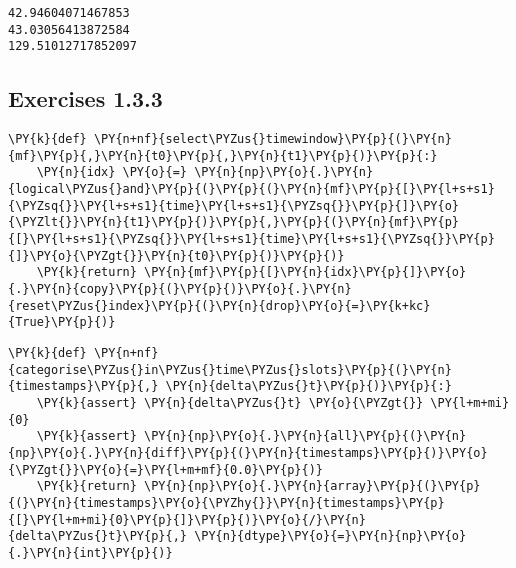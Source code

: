 \documentclass[11pt]{article}
\begin{document}
    \begin{Verbatim}[commandchars=\\\{\}]
42.94604071467853
43.03056413872584
129.51012717852097
    \end{Verbatim}

    \hypertarget{exercises-1.3.3}{%
\subsection*{Exercises 1.3.3}\label{exercises-1.3.3}}

    \begin{tcolorbox}[breakable, size=fbox, boxrule=1pt, pad at break*=1mm,colback=cellbackground, colframe=cellborder]
\begin{Verbatim}[commandchars=\\\{\}]
\PY{k}{def} \PY{n+nf}{select\PYZus{}timewindow}\PY{p}{(}\PY{n}{mf}\PY{p}{,}\PY{n}{t0}\PY{p}{,}\PY{n}{t1}\PY{p}{)}\PY{p}{:}
    \PY{n}{idx} \PY{o}{=} \PY{n}{np}\PY{o}{.}\PY{n}{logical\PYZus{}and}\PY{p}{(}\PY{p}{(}\PY{n}{mf}\PY{p}{[}\PY{l+s+s1}{\PYZsq{}}\PY{l+s+s1}{time}\PY{l+s+s1}{\PYZsq{}}\PY{p}{]}\PY{o}{\PYZlt{}}\PY{n}{t1}\PY{p}{)}\PY{p}{,}\PY{p}{(}\PY{n}{mf}\PY{p}{[}\PY{l+s+s1}{\PYZsq{}}\PY{l+s+s1}{time}\PY{l+s+s1}{\PYZsq{}}\PY{p}{]}\PY{o}{\PYZgt{}}\PY{n}{t0}\PY{p}{)}\PY{p}{)}
    \PY{k}{return} \PY{n}{mf}\PY{p}{[}\PY{n}{idx}\PY{p}{]}\PY{o}{.}\PY{n}{copy}\PY{p}{(}\PY{p}{)}\PY{o}{.}\PY{n}{reset\PYZus{}index}\PY{p}{(}\PY{n}{drop}\PY{o}{=}\PY{k+kc}{True}\PY{p}{)}
\end{Verbatim}
\end{tcolorbox}

    \begin{tcolorbox}[breakable, size=fbox, boxrule=1pt, pad at break*=1mm,colback=cellbackground, colframe=cellborder]
\begin{Verbatim}[commandchars=\\\{\}]
\PY{k}{def} \PY{n+nf}{categorise\PYZus{}in\PYZus{}time\PYZus{}slots}\PY{p}{(}\PY{n}{timestamps}\PY{p}{,} \PY{n}{delta\PYZus{}t}\PY{p}{)}\PY{p}{:}
    \PY{k}{assert} \PY{n}{delta\PYZus{}t} \PY{o}{\PYZgt{}} \PY{l+m+mi}{0}
    \PY{k}{assert} \PY{n}{np}\PY{o}{.}\PY{n}{all}\PY{p}{(}\PY{n}{np}\PY{o}{.}\PY{n}{diff}\PY{p}{(}\PY{n}{timestamps}\PY{p}{)}\PY{o}{\PYZgt{}}\PY{o}{=}\PY{l+m+mf}{0.0}\PY{p}{)}
    \PY{k}{return} \PY{n}{np}\PY{o}{.}\PY{n}{array}\PY{p}{(}\PY{p}{(}\PY{n}{timestamps}\PY{o}{\PYZhy{}}\PY{n}{timestamps}\PY{p}{[}\PY{l+m+mi}{0}\PY{p}{]}\PY{p}{)}\PY{o}{/}\PY{n}{delta\PYZus{}t}\PY{p}{,} \PY{n}{dtype}\PY{o}{=}\PY{n}{np}\PY{o}{.}\PY{n}{int}\PY{p}{)}
\end{Verbatim}
\end{tcolorbox}
\end{document}
